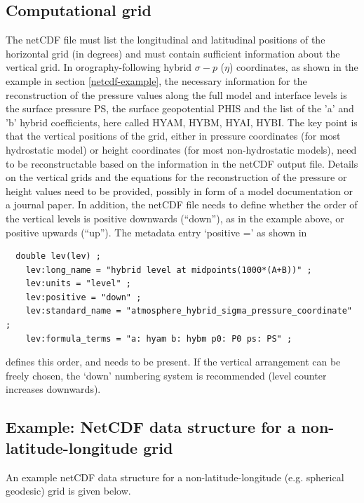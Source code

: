 \documentclass[times,doublespace]{fldauth}
\begin{document}
{\begin{appendix}
\subsection{Computational grid}
The netCDF file must list the longitudinal and latitudinal positions of the horizontal grid (in degrees) and must contain sufficient information about the vertical grid. In orography-following hybrid $\sigma-p$ ($\eta$) coordinates, as shown in the example in section \ref{netcdf-example}, the necessary information for the reconstruction of the pressure values along the full model and interface levels is the surface pressure PS, the surface geopotential PHIS and the list of the 'a' and 'b' hybrid coefficients, here called HYAM, HYBM, HYAI, HYBI. 
The key point is that the vertical positions of the grid, either in pressure coordinates (for most hydrostatic model) or height coordinates (for most non-hydrostatic models), need to be reconstructable based on the information in the netCDF output file. Details on the vertical grids and the equations for the reconstruction of the pressure or height values need to be provided, possibly in form of a model documentation or a journal paper. In addition, the netCDF file needs to define whether the order of the vertical levels is positive downwards (``down''), as in the example above, or positive upwards (``up''). The metadata entry `positive =' as shown in
\begin{verbatim}
  double lev(lev) ;
    lev:long_name = "hybrid level at midpoints(1000*(A+B))" ;
    lev:units = "level" ;
    lev:positive = "down" ;
    lev:standard_name = "atmosphere_hybrid_sigma_pressure_coordinate" ;
    lev:formula_terms = "a: hyam b: hybm p0: P0 ps: PS" ;
\end{verbatim}
defines this order, and needs to be present. If the vertical arrangement can be freely chosen, the `down' numbering system is recommended (level counter increases downwards).

\subsection{Example: NetCDF data structure for a non-latitude-longitude grid}
An example netCDF data structure for a non-latitude-longitude (e.g. spherical geodesic) grid is given below.


\end{appendix}}
\end{document}
